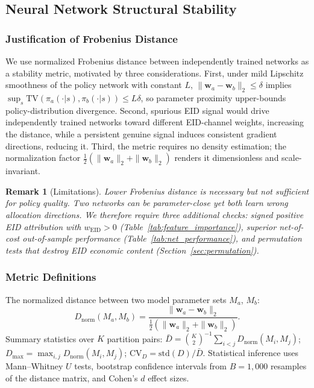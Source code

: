 \documentclass[12pt]{article}
\newtheorem{remark}{Remark}
\begin{document}
\subsection{Neural Network Structural Stability}
\label{sec:stability_metric}

\subsubsection{Justification of Frobenius Distance}

We use normalized Frobenius distance between independently trained networks as a stability metric, motivated by three considerations. First, under mild Lipschitz smoothness of the policy network with constant $L$, $\|\mathbf{w}_a-\mathbf{w}_b\|_2\leq\delta$ implies $\sup_{s}\mathrm{TV}(\pi_a(\cdot|s),\pi_b(\cdot|s))\leq L\delta$, so parameter proximity upper-bounds policy-distribution divergence. Second, spurious EID signal would drive independently trained networks toward different EID-channel weights, increasing the distance, while a persistent genuine signal induces consistent gradient directions, reducing it. Third, the metric requires no density estimation; the normalization factor $\frac{1}{2}(\|\mathbf{w}_a\|_2+\|\mathbf{w}_b\|_2)$ renders it dimensionless and scale-invariant.

\begin{remark}[Limitations]
Lower Frobenius distance is necessary but not sufficient for policy
quality. Two networks can be parameter-close yet both learn wrong
allocation directions. We therefore require three additional checks:
signed positive EID attribution with $w_{\mathrm{EID}}>0$
(Table~\ref{tab:feature_importance}), superior net-of-cost
out-of-sample performance (Table~\ref{tab:net_performance}), and
permutation tests that destroy EID economic content
(Section~\ref{sec:permutation}).
\end{remark}

\subsubsection{Metric Definitions}

The normalized distance between two model parameter sets $M_a$, $M_b$:
\begin{equation}
  D_{\mathrm{norm}}(M_a,M_b)
    = \frac{\|\mathbf{w}_a-\mathbf{w}_b\|_2}
           {\tfrac{1}{2}(\|\mathbf{w}_a\|_2+\|\mathbf{w}_b\|_2)}.
  \label{eq:frobenius_norm}
\end{equation}
Summary statistics over $K$ partition pairs:
$\bar{D}=\binom{K}{2}^{-1}\!\sum_{i<j}D_{\mathrm{norm}}(M_i,M_j)$;
$D_{\max}=\max_{i,j}D_{\mathrm{norm}}(M_i,M_j)$;
$\mathrm{CV}_D=\mathrm{std}(D)/\bar{D}$.
Statistical inference uses Mann--Whitney $U$ tests, bootstrap
confidence intervals from $B=1{,}000$ resamples of the distance matrix,
and Cohen's $d$ effect sizes.
\end{document}
